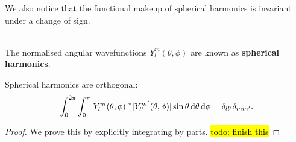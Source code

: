 We also notice that the functional makeup of spherical harmonics is invariant 
under a change of sign. 
\begin{defi}
\ \\
The normalised angular wavefunctions 
$Y^m_l(\theta,\phi)$ are known as \textbf{spherical harmonics}. 
\end{defi}
\begin{prt}
\label{sphharmorth}
Spherical harmonics are orthogonal:
\begin{equation}
\int^{2\pi}_0\int^{\pi}_0[Y^m_l(\theta,\phi)]^*[Y^{m'}_{l'}(\theta,\phi)]\sin\theta\dif\theta\dif\phi=\delta_{ll'}\delta_{mm'}. 
\end{equation}
\end{prt}
\begin{proof}
We prove this by explicitly integrating by parts. \hl{todo: finish this}
\end{proof}
